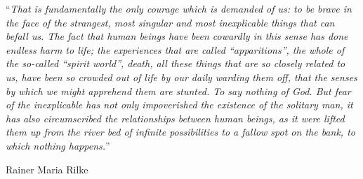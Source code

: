 
\vspace*{0.2\textheight}

\noindent\enquote{\itshape That is fundamentally the only courage which is demanded of us: to be brave in the face of the strangest, most singular and most inexplicable things that can befall us. The fact that human beings have been cowardly in this sense has done endless harm to life; the experiences that are called “apparitions”, the whole of the so-called “spirit world”, death, all these things that are so closely related to us, have been so crowded out of life by our daily warding them off, that the senses by which we might apprehend them are stunted. To say nothing of God. But fear of the inexplicable has not only impoverished the existence of the solitary man, it has also circumscribed the relationships between human beings, as it were lifted them up from the river bed of infinite possibilities to a fallow spot on the bank, to which nothing happens.}\bigbreak

\hfill Rainer Maria Rilke

